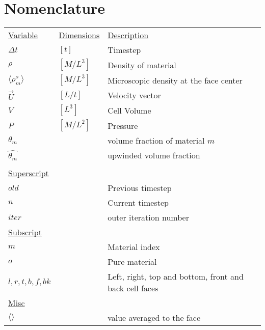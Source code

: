 \documentclass[fleqn]{article}
\newcommand{\rhoM}      {\ensuremath{\rho^{o}_m}}
\newcommand{\rhoMFC}    {\ensuremath{\langle \rhoM \rangle}}
\newcommand{\thetaUW}   {\ensuremath{\widehat{\theta_m}} }
\begin{document}
\section{Nomenclature}
\begin{tabular}{lll}
\\
\underline{Variable} & \underline{Dimensions} & \underline{Description }\\
$\Delta{t}$   &  $[t]$      &    Timestep\\
$\rho$        &  $[M/L^3]$  &    Density of material\\
$\rhoMFC$     &  $[M/L^3]$  &    Microscopic density at the face center\\
$\vec{U}$     &  $[L/t]$    &    Velocity vector\\
$V$           &  $[L^3]$    &    Cell Volume\\
$P$           &  $[M/L^2]$ &     Pressure\\ 
$\theta_m$    &             &    volume fraction of material $m$\\
$\thetaUW$    &             &    upwinded volume fraction\\
\\
\textsf{\underline{Superscript}}\\
$old$         &             &    Previous timestep\\
$n$           &             &    Current timestep\\
$iter$        &             &    outer iteration number \\

\textsf{\underline{Subscript}}\\
$m$           &             &    Material index\\
$o$           &             &    Pure material\\
$l,r,t,b,f,bk $       &     &    Left, right, top and bottom, front and back cell faces\\
\textsf{\underline{Misc}}\\
$\langle\rangle$ &          &    value averaged to the face\\
\end{tabular}
\end{document}
